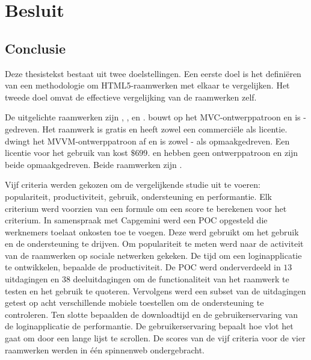 \chapter{Besluit}
\label{chap:besluit}

\section{Conclusie} %

Deze thesistekst bestaat uit twee doelstellingen.
Een eerste doel is het definiëren van een methodologie om HTML5-raamwerken met elkaar te vergelijken.
Het tweede doel omvat de effectieve vergelijking van de raamwerken zelf.

De uitgelichte raamwerken zijn \st{}, \kendo{},  \jqm{} en \lungo{}.
\st{} bouwt op het MVC-ontwerppatroon en is \js-gedreven.
Het raamwerk is gratis en heeft zowel een commerciële als  licentie.
\kendo{} dwingt het MVVM-ontwerppatroon af en is zowel \js- als opmaakgedreven.
Een licentie voor het gebruik van \kendo{} kost $\$699$.
\jqm{} en \lungo{} hebben geen ontwerppatroon en zijn beide opmaakgedreven.
Beide raamwerken zijn .

Vijf criteria werden gekozen om de vergelijkende studie uit te voeren:  populariteit,  productiviteit,  gebruik,  ondersteuning en performantie.
Elk criterium werd voorzien van een formule om een score te berekenen voor het criterium.
In samenspraak met Capgemini werd een POC opgesteld die werknemers toelaat onkosten toe te voegen.
Deze werd gebruikt om het gebruik en de ondersteuning te drijven.  
Om populariteit te meten werd naar de activiteit van de raamwerken op sociale netwerken gekeken.
De tijd om een loginapplicatie te ontwikkelen, bepaalde de productiviteit.
De POC werd onderverdeeld in $13$ uitdagingen en $38$ deeluitdagingen om de functionaliteit van het raamwerk te testen en het gebruik te quoteren.
Vervolgens werd een subset van de uitdagingen getest op acht verschillende mobiele toestellen om de ondersteuning te controleren.
Ten slotte bepaalden de downloadtijd en de gebruikerservaring van de loginapplicatie de performantie.
De gebruikerservaring bepaalt hoe vlot het gaat om door een lange lijst te scrollen.
De scores van de vijf criteria voor de vier raamwerken werden in één spinnenweb ondergebracht.


